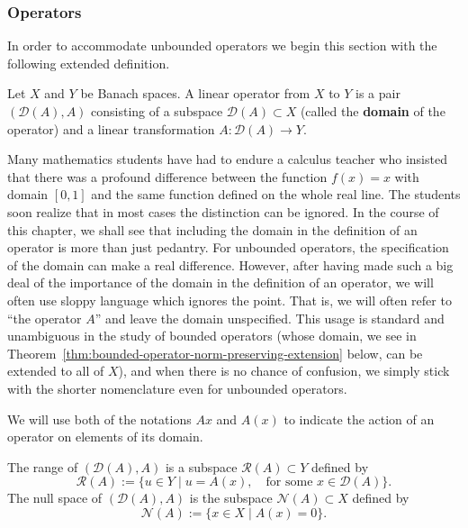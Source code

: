 \subsubsection{Operators}\label{subsec:operators}

In order to accommodate unbounded operators we begin this section with the following extended definition.

\begin{Definition}
\label{def:linear-operator-with-specified-domain}
Let $X$ and $Y$ be Banach spaces. A linear operator from $X$ to $Y$ is a pair $(\mathcal{D}(A),A)$ consisting of a subspace $\mathcal{D}(A)\subset X$ (called the \textbf{domain} of the operator) and a linear transformation $A:\mathcal{D}(A)\to Y$.
\end{Definition}

Many mathematics students have had to endure a calculus teacher who insisted that there was a profound difference between the function $f(x)=x$ with domain $[0,1]$ and the same function defined on the whole real line. The students soon realize that in most cases the distinction can be ignored. In the course of this chapter, we shall see that including the domain in the definition of an operator is more than just pedantry. For unbounded operators, the specification of the domain can make a real difference. However, after having made such a big deal of the importance of the domain in the definition of an operator, we will often use sloppy language which ignores the point. That is, we will often refer to ``the operator $A$'' and leave the domain unspecified. This usage is standard and unambiguous in the study of bounded operators (whose domain, we see in Theorem~\ref{thm:bounded-operator-norm-preserving-extension} below, can be extended to all of $X$), and when there is no chance of confusion, we simply stick with the shorter nomenclature even for unbounded operators.

We will use both of the notations $Ax$ and $A(x)$ to indicate the action of an operator on elements of its domain.

\begin{Definition}
\label{def:operator-range-null-space}
The range of $(\mathcal{D}(A),A)$ is a subspace $\mathcal{R}(A)\subset Y$ defined by
\begin{equation}\label{eq:linear-operator-range-definition}
\mathcal{R}(A):=\{u\in Y\mid u=A(x),\quad\text{for some }x\in\mathcal{D}(A)\}.
\end{equation}
The null space of $(\mathcal{D}(A),A)$ is the subspace $\mathcal{N}(A)\subset X$ defined by
\begin{equation}\label{eq:linear-operator-null-space-definition}
\mathcal{N}(A):=\{x\in X\mid A(x)=0\}.
\end{equation}

\end{Definition}


